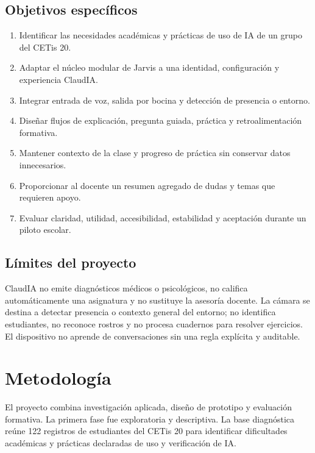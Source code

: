 \documentclass[letterpaper,11pt]{article}
\begin{document}
\subsection*{Objetivos específicos}
\begin{enumerate}
  \item Identificar las necesidades académicas y prácticas de uso de IA de un grupo del CETis 20.
  \item Adaptar el núcleo modular de Jarvis a una identidad, configuración y experiencia ClaudIA.
  \item Integrar entrada de voz, salida por bocina y detección de presencia o entorno.
  \item Diseñar flujos de explicación, pregunta guiada, práctica y retroalimentación formativa.
  \item Mantener contexto de la clase y progreso de práctica sin conservar datos innecesarios.
  \item Proporcionar al docente un resumen agregado de dudas y temas que requieren apoyo.
  \item Evaluar claridad, utilidad, accesibilidad, estabilidad y aceptación durante un piloto escolar.
\end{enumerate}

\subsection*{Límites del proyecto}
ClaudIA no emite diagnósticos médicos o psicológicos, no califica automáticamente una asignatura y no sustituye la asesoría docente. La cámara se destina a detectar presencia o contexto general del entorno; no identifica estudiantes, no reconoce rostros y no procesa cuadernos para resolver ejercicios. El dispositivo no aprende de conversaciones sin una regla explícita y auditable.

\clearpage

\section{Metodología}

El proyecto combina investigación aplicada, diseño de prototipo y evaluación formativa. La primera fase fue exploratoria y descriptiva. La base diagnóstica reúne 122 registros de estudiantes del CETis 20 para identificar dificultades académicas y prácticas declaradas de uso y verificación de IA.
\end{document}
